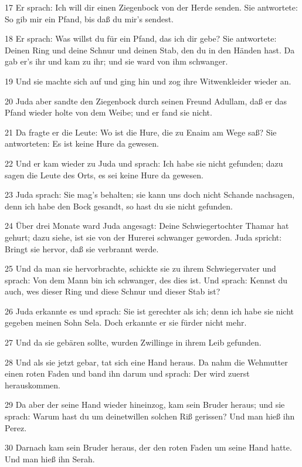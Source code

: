 \par 17 Er sprach: Ich will dir einen Ziegenbock von der Herde senden. Sie antwortete: So gib mir ein Pfand, bis daß du mir's sendest.
\par 18 Er sprach: Was willst du für ein Pfand, das ich dir gebe? Sie antwortete: Deinen Ring und deine Schnur und deinen Stab, den du in den Händen hast. Da gab er's ihr und kam zu ihr; und sie ward von ihm schwanger.
\par 19 Und sie machte sich auf und ging hin und zog ihre Witwenkleider wieder an.
\par 20 Juda aber sandte den Ziegenbock durch seinen Freund Adullam, daß er das Pfand wieder holte von dem Weibe; und er fand sie nicht.
\par 21 Da fragte er die Leute: Wo ist die Hure, die zu Enaim am Wege saß? Sie antworteten: Es ist keine Hure da gewesen.
\par 22 Und er kam wieder zu Juda und sprach: Ich habe sie nicht gefunden; dazu sagen die Leute des Orts, es sei keine Hure da gewesen.
\par 23 Juda sprach: Sie mag's behalten; sie kann uns doch nicht Schande nachsagen, denn ich habe den Bock gesandt, so hast du sie nicht gefunden.
\par 24 Über drei Monate ward Juda angesagt: Deine Schwiegertochter Thamar hat gehurt; dazu siehe, ist sie von der Hurerei schwanger geworden. Juda spricht: Bringt sie hervor, daß sie verbrannt werde.
\par 25 Und da man sie hervorbrachte, schickte sie zu ihrem Schwiegervater und sprach: Von dem Mann bin ich schwanger, des dies ist. Und sprach: Kennst du auch, wes dieser Ring und diese Schnur und dieser Stab ist?
\par 26 Juda erkannte es und sprach: Sie ist gerechter als ich; denn ich habe sie nicht gegeben meinen Sohn Sela. Doch erkannte er sie fürder nicht mehr.
\par 27 Und da sie gebären sollte, wurden Zwillinge in ihrem Leib gefunden.
\par 28 Und als sie jetzt gebar, tat sich eine Hand heraus. Da nahm die Wehmutter einen roten Faden und band ihn darum und sprach: Der wird zuerst herauskommen.
\par 29 Da aber der seine Hand wieder hineinzog, kam sein Bruder heraus; und sie sprach: Warum hast du um deinetwillen solchen Riß gerissen? Und man hieß ihn Perez.
\par 30 Darnach kam sein Bruder heraus, der den roten Faden um seine Hand hatte. Und man hieß ihn Serah.

